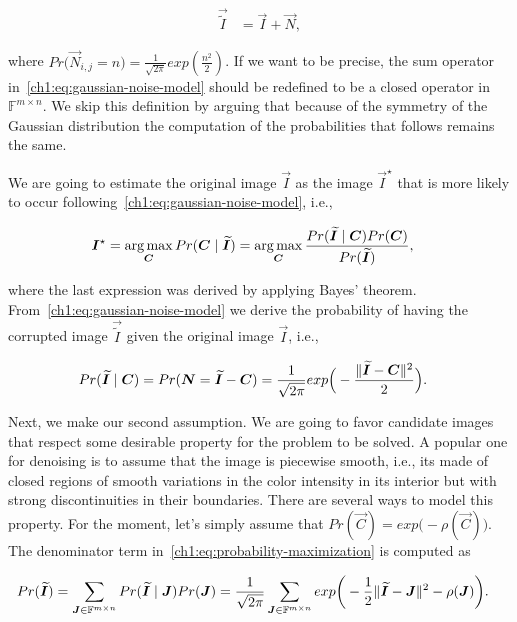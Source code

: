 \begin{align}
	\vec{\widetilde{I}} &= \vec{I} + \vec{N},
	\label{ch1:eq:gaussian-noise-model}
\end{align} 

where $Pr\big( \vec{N}_{i,j} = n \big) = \frac{1}{\sqrt{2\pi}}exp( \frac{n^2}{2} )$. If we want to be precise, the sum operator in~\cref{ch1:eq:gaussian-noise-model} should be redefined to be a closed operator in $\mathbb{F}^{m \times n}$. We skip this definition by arguing that because of the symmetry of the Gaussian distribution the computation of the probabilities that follows remains the same.

 We are going to estimate the original image $\vec{I}$ as the image $\vec{I}^{\star}$ that is more likely to occur following~\cref{ch1:eq:gaussian-noise-model}, i.e., 

\begin{align}
	\bm{I}^{\star} & = \operatorname*{arg\,max} _{\bm{C}}{Pr(\bm{C} \; | \;\bm{\widetilde{I}})} = \operatorname*{arg\,max} _{\bm{C}} \frac{Pr(\bm{\widetilde{I}} \; | \; \bm{C})Pr(\bm{C})}{Pr(\bm{\widetilde{I}})},
	\label{ch1:eq:probability-maximization}
\end{align}

where the last expression was derived by applying Bayes' theorem. From~\cref{ch1:eq:gaussian-noise-model} we derive the probability of having the corrupted image $\vec{\widetilde{I}}$ given the original image $\vec{I}$, i.e.,

\begin{align}
	Pr(\bm{\widetilde{I}} \; | \; \bm{C}) &= Pr( \bm{N} = \bm{\widetilde{I}} - \bm{C} ) = \frac{1}{\sqrt{2\pi}}exp\Big(- \frac{ \lVert\bm{\widetilde{I}} - \bm{C} \rVert^2}{2} \Big).
	\label{ch1:eq:probability-corrupted-image-given-original}
\end{align}

Next, we make our second assumption. We are going to favor candidate images that respect some desirable property for the problem to be solved. A popular one for denoising is to assume that the image is piecewise smooth, i.e., its made of closed regions of smooth variations in the color intensity in its interior but with strong discontinuities in their boundaries. There are several ways to model this property. For the moment, let's simply assume that $Pr(\vec{C}) = exp\big(-\rho(\vec{C})\big)$. The denominator term in~\cref{ch1:eq:probability-maximization} is computed as

\begin{align*}
	Pr(\widetilde{\bm{I}}) &= \sum_{\bm{J} \in \mathbb{F}^{m \times n}}{Pr(\bm{\widetilde{I}}\;|\; \bm{J})Pr(\bm{J})} = \frac{1}{\sqrt{2 \pi}}\sum_{\bm{J} \in \mathbb{F}^{m \times n}}{exp\bigg(-\frac{1}{2}\lVert\widetilde{\bm{I}}-\bm{J}\rVert^2 - \rho(\bm{J})}\bigg).
\end{align*}

